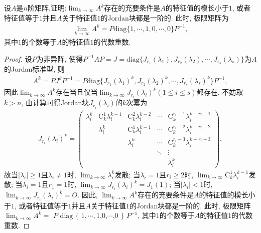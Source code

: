 \documentclass[../../main.tex]{subfiles}%
\begin{document}
\begin{proposition}\label{proposition:矩阵方幂极限存在的充要条件及极限矩阵}
设$A$是$n$阶矩阵,证明:$\lim_{k \to \infty} A^k$存在的充要条件是$A$的特征值的模长小于$1$, 或者特征值等于$1$并且$A$关于特征值$1$的Jordan块都是一阶的. 此时, 极限矩阵为
\begin{align*}
\lim_{k \to \infty} A^k = P\mathrm{diag}\{1,\cdots,1,0,\cdots,0\}P^{-1},
\end{align*}
其中$1$的个数等于$A$的特征值$1$的代数重数.
\end{proposition}
\begin{proof}
设$P$为非异阵, 使得$P^{-1}AP = J=\mathrm{diag}\{J_{r_1}(\lambda_1),J_{r_2}(\lambda_2),\cdots,J_{r_s}(\lambda_s)\}$为$A$的Jordan标准型, 则
\begin{align*}
A^k = PJ^kP^{-1}=P\mathrm{diag}\{J_{r_1}(\lambda_1)^k,J_{r_2}(\lambda_2)^k,\cdots,J_{r_s}(\lambda_s)^k\}P^{-1},
\end{align*}
因此$\lim_{k \to \infty} A^k$存在当且仅当$\lim_{k \to \infty} J_{r_i}(\lambda_i)^k (1\leqslant i \leqslant s)$都存在. 不妨取$k > n$, 由计算可得Jordan块$J_{r_i}(\lambda_i)$的$k$次幂为
\begin{align*}
J_{r_i}(\lambda_i)^k = 
\begin{pmatrix}
\lambda_i^k & \mathrm{C}_{k}^{1}\lambda_i^{k - 1} & \mathrm{C}_{k}^{2}\lambda_i^{k - 2} & \cdots & \mathrm{C}_{k}^{r_i - 1}\lambda_i^{k - r_i + 1} \\
 & \lambda_i^k & \mathrm{C}_{k}^{1}\lambda_i^{k - 1} & \cdots & \mathrm{C}_{k}^{r_i - 2}\lambda_i^{k - r_i + 2} \\
 & & \lambda_i^k & \cdots & \mathrm{C}_{k}^{r_i - 3}\lambda_i^{k - r_i + 3} \\
 & & & \ddots & \vdots \\
 & & & & \lambda_i^k
\end{pmatrix},
\end{align*}
故当$|\lambda_i|\geqslant 1$且$\lambda_i\neq 1$时, $\lim_{k \to \infty} \lambda_i^k$发散; 当$\lambda_i = 1$且$r_i\geqslant 2$时, $\lim_{k \to \infty} \mathrm{C}_{k}^{1}\lambda_i^{k - 1}$发散; 当$\lambda_i = 1$且$r_1 = 1$时, $\lim_{k \to \infty} J_{r_i}(\lambda_i)^k = J_1(1)$; 当$|\lambda_i| < 1$时, $\lim_{k \to \infty} J_{r_i}(\lambda_i)^k = O$. 因此, $\lim_{k \to \infty} A^k$存在的充要条件是$A$的特征值的模长小于$1$, 或者特征值等于$1$并且$A$关于特征值$1$的Jordan块都是一阶的. 此时, 极限矩阵$\lim_{k \to \infty} A^k = $ $P$ $\mathrm{diag}$ $\{$ $1,\cdots,1$,$0$,$\cdots$,$0$ $\}$ $P^{-1}$, 其中$1$的个数等于$A$的特征值$1$的代数重数.
\end{proof}
\end{document}

